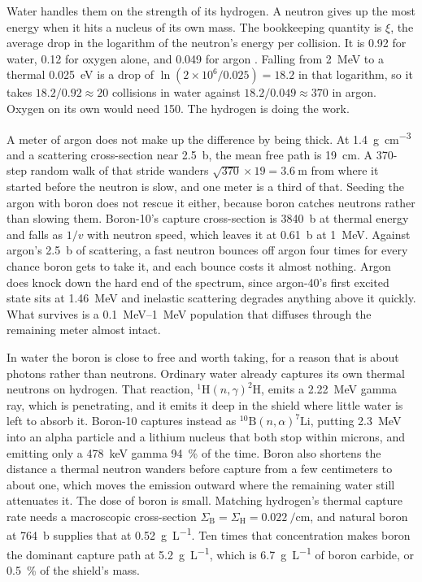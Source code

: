 \documentclass{article}
\begin{document}
Water handles them on the strength of its hydrogen. A neutron gives up the most energy when it hits a nucleus of its own mass. The bookkeeping quantity is $\xi$, the average drop in the logarithm of the neutron's energy per collision. It is 0.92 for water, 0.12 for oxygen alone, and 0.049 for argon \cite{lamarsh2018nuclear}. Falling from \SI{2}{\mega\electronvolt} to a thermal \SI{0.025}{\electronvolt} is a drop of $\ln(2\times10^{6}/0.025) = 18.2$ in that logarithm, so it takes $18.2/0.92 \approx 20$ collisions in water against $18.2/0.049 \approx 370$ in argon. Oxygen on its own would need 150. The hydrogen is doing the work.

A meter of argon does not make up the difference by being thick. At \SI{1.4}{\gram\per\cubic\centi\meter} and a scattering cross-section near \SI{2.5}{\barn}, the mean free path is \SI{19}{\centi\meter}. A 370-step random walk of that stride wanders $\sqrt{370}\times19 = \SI{3.6}{\meter}$ from where it started before the neutron is slow, and one meter is a third of that. Seeding the argon with boron does not rescue it either, because boron catches neutrons rather than slowing them. Boron-10's capture cross-section is \SI{3840}{\barn} at thermal energy and falls as $1/v$ with neutron speed, which leaves it at \SI{0.61}{\barn} at \SI{1}{\mega\electronvolt}. Against argon's \SI{2.5}{\barn} of scattering, a fast neutron bounces off argon four times for every chance boron gets to take it, and each bounce costs it almost nothing. Argon does knock down the hard end of the spectrum, since argon-40's first excited state sits at \SI{1.46}{\mega\electronvolt} and inelastic scattering degrades anything above it quickly. What survives is a \SIrange{0.1}{1}{\mega\electronvolt} population that diffuses through the remaining meter almost intact.

In water the boron is close to free and worth taking, for a reason that is about photons rather than neutrons. Ordinary water already captures its own thermal neutrons on hydrogen. That reaction, $^{1}\mathrm{H}(n,\gamma)^{2}\mathrm{H}$, emits a \SI{2.22}{\mega\electronvolt} gamma ray, which is penetrating, and it emits it deep in the shield where little water is left to absorb it. Boron-10 captures instead as $^{10}\mathrm{B}(n,\alpha)^{7}\mathrm{Li}$, putting \SI{2.3}{\mega\electronvolt} into an alpha particle and a lithium nucleus that both stop within microns, and emitting only a \SI{478}{\kilo\electronvolt} gamma \SI{94}{\percent} of the time. Boron also shortens the distance a thermal neutron wanders before capture from a few centimeters to about one, which moves the emission outward where the remaining water still attenuates it. The dose of boron is small. Matching hydrogen's thermal capture rate needs a macroscopic cross-section $\Sigma_{\mathrm{B}} = \Sigma_{\mathrm{H}} = \SI{0.022}{\per\centi\meter}$, and natural boron at \SI{764}{\barn} supplies that at \SI{0.52}{\gram\per\liter}. Ten times that concentration makes boron the dominant capture path at \SI{5.2}{\gram\per\liter}, which is \SI{6.7}{\gram\per\liter} of boron carbide, or \SI{0.5}{\percent} of the shield's mass.
\end{document}
